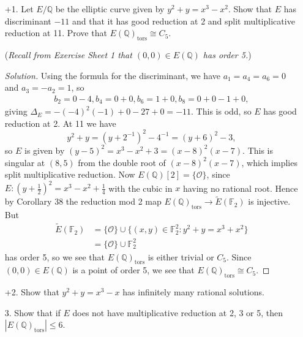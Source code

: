 \documentclass[a4paper]{article}
\theoremstyle{definition}
\newcommand{\tors}{\mathrm{tors}}
\renewcommand{\O}{\mathcal{O}}
\newcommand{\F}{\mathbb{F}}
\newcommand{\Q}{\mathbb{Q}}
\begin{document}
\begin{enumerate}
    \item[+1.] Let $E/\Q$ be the elliptic curve given by $y^2+y=x^3-x^2$. Show
        that $E$ has discriminant $-11$ and that it has good reduction at 2 and
        split multiplicative reduction at 11. Prove that $E(\Q)_\tors\cong C_5$.

        (\textit{Recall from Exercise Sheet 1 that $(0,0)\in E(\Q)$ has order
        5.})

        \begin{proof}[Solution]
            Using the formula for the discriminant, we have $a_1=a_4=a_6=0$ and
            $a_3=-a_2=1$, so
            \begin{align*}
                b_2=0-4, b_4=0+0, b_6=1+0, b_8=0+0-1+0,
            \end{align*}
            giving $\Delta_E = -(-4)^2(-1) + 0 - 27 + 0 = -11$. This is odd, so
            $E$ has good reduction at 2. At 11 we have
            \begin{equation*}
                y^2+y = (y+2^{-1})^2-4^{-1} = (y+6)^2-3,
            \end{equation*}
            so $E$ is given by $(y-5)^2=x^3-x^2+3=(x-8)^2(x-7)$. This is
            singular at $(8,5)$ from the double root of $(x-8)^2(x-7)$, which
            implies split multiplicative reduction. Now $E(\Q)[2]=\{\O\}$, since
            $E:(y+\frac{1}{2})^2=x^3-x^2+\frac{1}{4}$ with the cubic in $x$
            having no rational root. Hence by Corollary 38 the reduction mod 2
            map $E(\Q)_\tors\to\tilde E(\F_2)$ is injective. But
            \begin{align*}
                \tilde E(\F_2)
                    &= \{\O\} \cup \{(x,y)\in\F_2^2:y^2+y=x^3+x^2\} \\
                    &= \{\O\} \cup \F_2^2
            \end{align*}
            has order 5, so we see that $E(\Q)_\tors$ is either trivial or
            $C_5$. Since $(0,0)\in E(\Q)$ is a point of order 5, we see that
            $E(\Q)_\tors\cong C_5$.
        \end{proof}

    \item[+2.] Show that $y^2+y=x^3-x$ has infinitely many rational solutions.

    \item[3.] Show that if $E$ does not have multiplicative reduction at 2, 3 or
        5, then $|E(\Q)_\tors|\le6$.


\end{enumerate}
\end{document}
